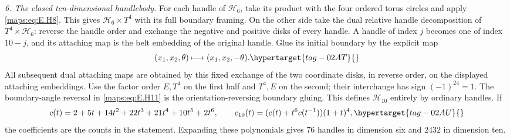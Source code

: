 \begin{theorem}
\emph{6. The closed ten-dimensional handlebody.}
For each handle of $\mathcal H_6$, take its product with the four
ordered torus circles and apply \eqref{maps:eq:E.H8}.  This gives
$\mathcal H_6\times T^4$ with its full boundary framing.  On the
other side take the dual relative handle decomposition of
$T^4\times\mathcal H_6$: reverse the handle order and exchange
the negative and positive disks of every handle.  A handle of
index $j$ becomes one of index $10-j$, and its attaching map is
the belt embedding of the original handle.  Glue its
initial boundary by the explicit map
\begin{equation}
                 (x_1,x_2,\theta)\longmapsto
                                    (x_1,x_2,-\theta).
 \hypertarget{tag-02AT}{}\label{maps:eq:E.H11}
\end{equation}
All subsequent dual attaching maps are obtained by this fixed
exchange of the two coordinate disks, in reverse order, on the
displayed attaching embeddings. Use the factor order $E,T^4$
on the first half and $T^4,E$ on the second; their interchange
has sign $(-1)^{24}=1$.  The boundary-angle reversal in \eqref{maps:eq:E.H11}
is the orientation-reversing boundary gluing.  This defines
$\mathcal H_{10}$ entirely by ordinary handles.  If
\begin{equation}
 c(t)=2+5t+14t^2+22t^3+21t^4+10t^5+2t^6,
 \qquad
       c_{10}(t)=(c(t)+t^6c(t^{-1}))(1+t)^4,
 \hypertarget{tag-02AU}{}\label{maps:eq:E.H12}
\end{equation}
the coefficients are the counts in the statement.  Expanding these polynomials gives $76$ handles in dimension six
and $2432$ in dimension ten.

\end{theorem}


